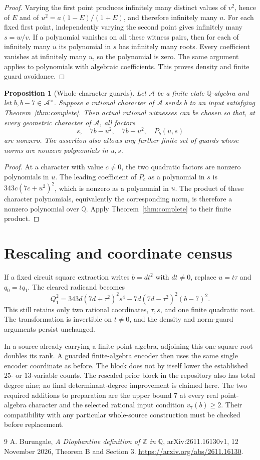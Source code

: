 \documentclass[11pt]{article}
\newtheorem{proposition}[theorem]{Proposition}
\newcommand{\Q}{\mathbb Q}
\newcommand{\Z}{\mathbb Z}
\begin{document}
\begin{proof}
Varying the first point produces infinitely many distinct values of
$v^2$, hence of $E$ and of $u^2=a(1-E)/(1+E)$, and therefore infinitely
many $u$. For each fixed first point, independently varying the second
point gives infinitely many $s=w/v$. If a polynomial vanishes on all
these witness pairs, then for each of infinitely many $u$ its
polynomial in $s$ has infinitely many roots. Every coefficient
vanishes at infinitely many $u$, so the polynomial is zero.
The same argument applies to polynomials with algebraic coefficients.
This proves density and finite guard avoidance.
\end{proof}

\begin{proposition}[Whole-character guards]\label{prop:guards}
Let $\mathcal A$ be a finite etale $\Q$-algebra and let
$b,b-7\in\mathcal A^\times$. Suppose a rational character of
$\mathcal A$ sends $b$ to an input satisfying Theorem~\ref{thm:complete}.
Then actual rational witnesses can be chosen so that, at every
geometric character of $\mathcal A$, all factors
\[
 s,\quad7b-u^2,\quad7b+u^2,\quad P_b(u,s)
\]
are nonzero. The assertion also allows any further finite set of
guards whose norms are nonzero polynomials in $u,s$.
\end{proposition}
\begin{proof}
At a character with value $c\ne0$, the two quadratic factors are
nonzero polynomials in $u$. The leading coefficient of $P_c$ as a
polynomial in $s$ is $343c(7c+u^2)^2$, which is nonzero as a polynomial
in $u$. The product of these character polynomials, equivalently the
corresponding norm, is therefore a nonzero polynomial over $\Q$.
Apply Theorem~\ref{thm:complete} to their finite product.
\end{proof}

\section{Rescaling and coordinate census}

If a fixed circuit square extraction writes $b=d t^2$ with $dt\ne0$,
replace $u=t\tau$ and $q_0=tq_1$. The cleared radicand becomes
\[
 Q_1^2=343d(7d+\tau^2)^2s^4
       -7d(7d-\tau^2)^2(b-7)^2.
\]
This still retains only two rational coordinates, $\tau,s$, and one
finite quadratic root. The transformation is invertible on $t\ne0$,
and the density and norm-guard arguments persist unchanged.

In a source already carrying a finite point algebra, adjoining this
one square root doubles its rank. A guarded finite-algebra encoder
then uses the same single encoder coordinate as before. The block
does not by itself lower the established $25$- or $13$-variable counts.
The rescaled prior block in the repository also has total degree
nine; no final determinant-degree improvement is claimed here.
The two required additions to preparation are the upper bound $7$
at every real point-algebra character and the selected rational
input condition $v_7(b)\ge2$. Their compatibility with any particular
whole-source construction must be checked before replacement.

\begin{thebibliography}{9}
 A. Burungale, \emph{A Diophantine definition of $\Z$ in $\Q$},
arXiv:2611.16130v1, 12 November 2026, Theorem B and Section 3.
\url{https://arxiv.org/abs/2611.16130}.
\end{thebibliography}
\end{document}
